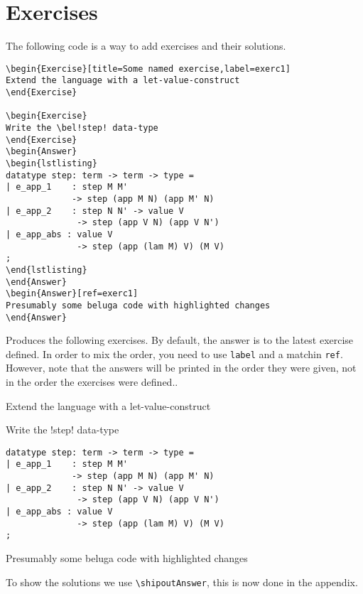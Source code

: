\documentclass[12pt]{article}
\begin{document}
\section{Exercises}
The following code is a way to add exercises and their solutions.
\begin{verbatim}
\begin{Exercise}[title=Some named exercise,label=exerc1]
Extend the language with a let-value-construct
\end{Exercise}

\begin{Exercise}
Write the \bel!step! data-type
\end{Exercise}
\begin{Answer}
\begin{lstlisting}
datatype step: term -> term -> type =
| e_app_1    : step M M'
             -> step (app M N) (app M' N)
| e_app_2    : step N N' -> value V
              -> step (app V N) (app V N')
| e_app_abs : value V
              -> step (app (lam M) V) (M V)
;
\end{lstlisting}
\end{Answer}
\begin{Answer}[ref=exerc1]
Presumably some beluga code with highlighted changes
\end{Answer}
\end{verbatim}
Produces the following exercises. By default, the answer is to the latest exercise defined. In order to mix the order, you need to use \verb!label! and a matchin \verb!ref!. However, note that the answers will be printed in the order they were given, not in the order the exercises were defined..
\begin{Exercise}[title=Some named exercise,label=exerc1]
Extend the language with a let-value-construct
\end{Exercise}
\begin{Exercise}
Write the \bel!step! data-type
\end{Exercise}
\begin{Answer}
\begin{lstlisting}
datatype step: term -> term -> type =
| e_app_1    : step M M'
             -> step (app M N) (app M' N)
| e_app_2    : step N N' -> value V
              -> step (app V N) (app V N')
| e_app_abs : value V
              -> step (app (lam M) V) (M V)
;
\end{lstlisting}
\end{Answer}
\begin{Answer}[ref=exerc1]
Presumably some beluga code with highlighted changes
\end{Answer}

To show the solutions we use \verb|\shipoutAnswer|, this is now done in the appendix.

\shipoutAnswer
\end{document}
